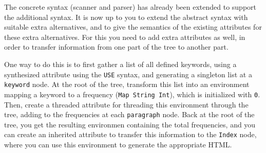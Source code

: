 \documentclass[a4paper]{article}
\begin{document}
The concrete syntax (scanner and parser) has already been extended to support the additional syntax. It is now up to you to extend the abstract syntax with suitable extra alternatives, and to give the semantics of the existing attributes for these extra alternatives. For this you need to add extra attributes as well, in order to transfer information from one part of the tree to another part.

One way to do this is to first gather a list of all defined keywords, using a synthesized attribute using the {\tt USE} syntax, and generating a singleton list at a {\tt keyword} node. At the root of the tree, transform this list into an environment mapping a keyword to a frequency ({\tt Map String Int}), which is initialized with {\tt 0}. Then, create a threaded attribute for threading this environment through the tree, adding to the frequencies at each {\tt paragraph} node. Back at the root of the tree, you get the resulting environmen containing the total frequencies, and you can create an inherited attribute to transfer this information to the {\tt Index} node, where you can use this environment to generate the appropriate HTML.
\end{document}
